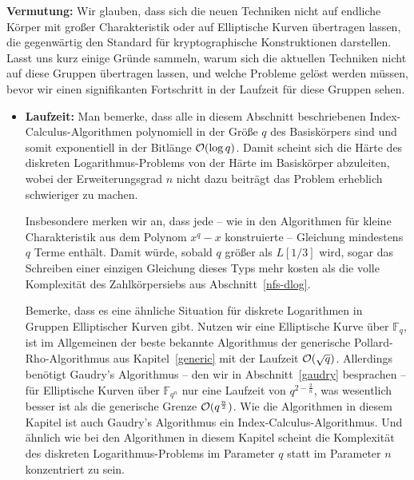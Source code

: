 \begin{refsegment}
\textbf{Vermutung:} Wir glauben, dass sich die neuen Techniken nicht auf endliche Körper mit großer Charakteristik oder auf Elliptische Kurven übertragen lassen, die gegenwärtig den Standard für kryptographische Konstruktionen darstellen.\\[0.1cm]

Lasst uns kurz einige Gründe sammeln, warum sich die aktuellen Techniken nicht auf diese Gruppen übertragen lassen, und welche Probleme gelöst werden müssen, bevor wir einen signifikanten Fortschritt in der Laufzeit für diese Gruppen sehen.

\begin{itemize}
\item \textbf{Laufzeit:} Man bemerke, dass alle in diesem Abschnitt beschriebenen Index-Calculus-Algorithmen polynomiell in der Größe $q$ des Basiskörpers sind und somit exponentiell in der Bitlänge ${\cal O}(\log q)$. Damit scheint sich die Härte des diskreten Logarithmus-Problems von der Härte im Basiskörper abzuleiten, wobei der Erweiterungsgrad $n$ nicht dazu beiträgt das Problem erheblich schwieriger zu machen.

Insbesondere merken wir an, dass jede -- wie in den Algorithmen für kleine Charakteristik aus dem Polynom $x^q-x$ konstruierte -- Gleichung mindestens $q$ Terme enthält. Damit würde, sobald $q$ größer als $L[1/3]$ wird, sogar das Schreiben einer einzigen Gleichung dieses Typs mehr kosten als die volle Komplexität des Zahlkörpersiebs aus Abschnitt~\ref{nfs-dlog}.

Bemerke, dass es eine ähnliche Situation für diskrete Logarithmen in Gruppen Elliptischer Kurven gibt. Nutzen wir eine Elliptische Kurve über $\mathbb{F}_q$, ist im Allgemeinen der beste bekannte Algorithmus der generische Pollard-Rho-Algorithmus aus Kapitel~\ref{generic} mit der Laufzeit ${\cal O}(\sqrt q)$. Allerdings benötigt Gaudry's Algorithmus -- den wir in Abschnitt~\ref{gaudry} besprachen -- für Elliptische Kurven über $\mathbb{F}_{q^n}$ nur eine Laufzeit von $q^{2-\frac 2 n}$, was wesentlich besser ist als die generische Grenze ${\cal O}(q^{\frac n 2})$. Wie die Algorithmen in diesem Kapitel ist auch Gaudry's Algorithmus ein Index-Calculus-Algorithmus. Und ähnlich wie bei den Algorithmen in diesem Kapitel scheint die Komplexität des diskreten Logarithmus-Problems im Parameter $q$ statt im Parameter $n$ konzentriert zu sein.


\end{itemize}
\end{refsegment}
